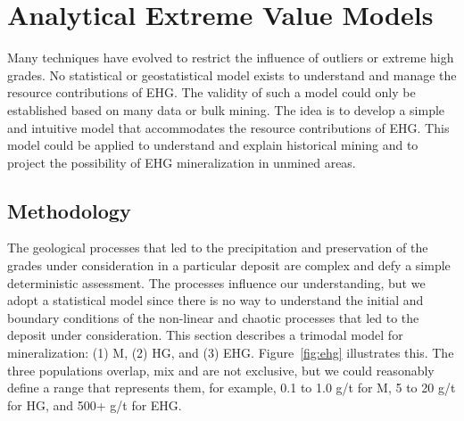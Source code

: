 

\FloatBarrier
\section{Analytical Extreme Value Models}
\label{sec:02analytical}

Many techniques have evolved to restrict the influence of outliers or extreme high grades. No statistical or geostatistical model exists to understand and manage the resource contributions of \gls{EHG}. The validity of such a model could only be established based on many data or bulk mining. The idea is to develop a simple and intuitive model that accommodates the resource contributions of \gls{EHG}. This model could be applied to understand and explain historical mining and to project the possibility of \gls{EHG} mineralization in unmined areas.

\subsection{Methodology}
\label{subsec:02methodehg}

The geological processes that led to the precipitation and preservation of the grades under consideration in a particular deposit are complex and defy a simple deterministic assessment. The processes influence our understanding, but we adopt a statistical model since there is no way to understand the initial and boundary conditions of the non-linear and chaotic processes that led to the deposit under consideration. This section describes a trimodal model for mineralization: (1) \acrfull{M}, (2) \acrfull{HG}, and (3) \acrfull{EHG}. Figure~\ref{fig:ehg} illustrates this. The three populations overlap, mix and are not exclusive, but we could reasonably define a range that represents them, for example, 0.1 to 1.0 g/t for \gls{M}, 5 to 20 g/t for \gls{HG}, and 500+ g/t for \gls{EHG}.

